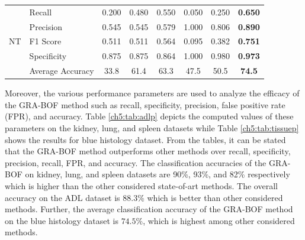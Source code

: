 \begin{table}[h]
{\begin{tabular}{|c|l|c|c|c|c|c|c|}
    \hline
    &    Recall    &    0.200    &    0.480    &    0.550    &    0.050    &    0.250    &    \textbf{0.650    }\\
    &    Precision    &    0.545    &    0.545    &    0.579    &    1.000    &    0.806    &\textbf{    0.890}    \\
NT    &    F1 Score     &    0.511    &    0.511    &    0.564    &    0.095    &    0.382    &\textbf{    0.751    }\\
    &    Specificity    &    0.875    &    0.875    &    0.864    &    1.000    &    0.980    &    \textbf{0.973}    \\
    \cline{2-8}
    &    Average Accuracy    &    33.8    &    61.4    &    63.3    &    47.5    &    50.5    &\textbf{    74.5    }\\

\hline
\end{tabular}
}
\end{table}

Moreover, the various performance parameters are used to analyze the efficacy of the GRA-BOF method such as recall, specificity, precision, false positive rate (FPR), and accuracy. Table \ref{ch5:tab:adlp} depicts the computed values of these parameters on the kidney, lung, and spleen datasets while Table \ref{ch5:tab:tissuep} shows the results for blue histology dataset. From the tables, it can be stated that the GRA-BOF method outperforms other methods over recall, specificity, precision, recall, FPR, and accuracy. The classification accuracies of the GRA-BOF on kidney, lung, and spleen datasets are  90\%, 93\%, and 82\% respectively which is higher than the other considered state-of-art methods. The overall accuracy on the ADL dataset is 88.3\% which is better than other considered methods. Further, the average classification accuracy of the GRA-BOF method on the blue histology dataset is $74.5\%$, which is highest among other considered methods.



